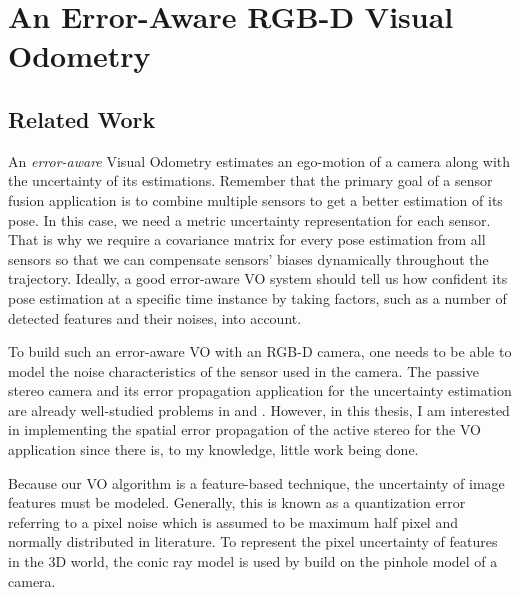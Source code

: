 \documentclass[a4paper]{report}
\numberwithin{figure}{section}
\begin{document}
\chapter{An Error-Aware RGB-D Visual Odometry} \label{cp_covo}

\section{Related Work} \label{sc_error_aware_visual_odometry_related_works}

An \textit{error-aware} Visual Odometry estimates an ego-motion of a camera
along with the uncertainty of its estimations.  Remember that the primary goal
of a sensor fusion application is to combine multiple sensors to get a better
estimation of its pose.  In this case, we need a metric uncertainty
representation for each sensor.  That is why we require a covariance matrix for
every pose estimation from all sensors so that we can compensate sensors'
biases dynamically throughout the trajectory.  Ideally, a good error-aware VO
system should tell us how confident its pose estimation at a specific time
instance by taking factors, such as a number of detected features and their
noises, into account.

To build such an error-aware VO with an RGB-D camera, one needs to be able to
model the noise characteristics of the sensor used in the camera. The passive
stereo camera and its error propagation application for the uncertainty
estimation are already well-studied problems in \parencite{Leo2011} and
\parencite{Miura1993AnUM}.
However, in this thesis, I am interested in implementing the spatial error
propagation of the active stereo for the VO application since there is, to my
knowledge, little work being done.

Because our VO algorithm is a feature-based technique, the uncertainty of image
features must be modeled.  Generally, this is known as a quantization error
referring to a pixel noise \parencite{RichardHartley2003} which is assumed to 
be
maximum half pixel and normally distributed in literature.  To represent the
pixel uncertainty of features in the 3D world, the conic ray model
\parencite{Sola2007a} is used by build on the pinhole model of a camera.
\end{document}
